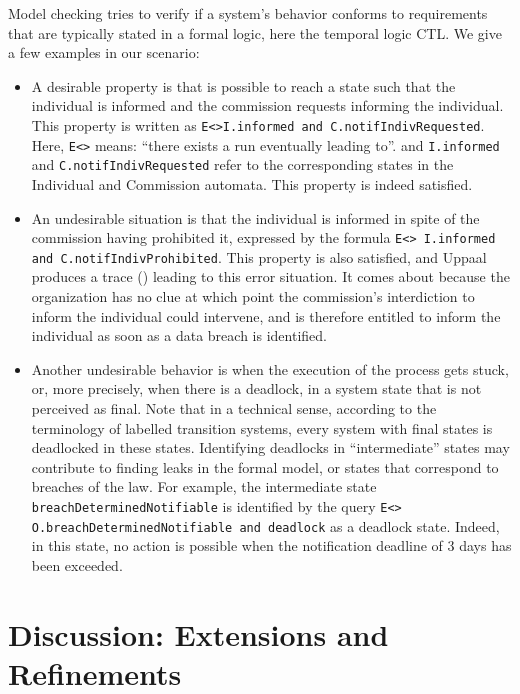 Model checking tries to verify if a system's behavior conforms to requirements
that are typically stated in a formal logic, here the temporal logic CTL. We
give a few  examples in our scenario:

\begin{itemize}
\item A desirable property is that is possible to reach a state such that the
  individual is informed and the commission requests informing the
  individual. This property is written as \texttt{E<>I.informed and
    C.notifIndivRequested}. Here, \texttt{E<>} means: ``there exists a run
  eventually leading to''. and \texttt{I.informed} and
  \texttt{C.notifIndivRequested} refer to the corresponding states in the
  Individual and Commission automata. This property is indeed satisfied.

  
\item An undesirable situation is that the individual is informed in spite of
  the commission having prohibited it, expressed by the formula \texttt{E<>
    I.informed and C.notifIndivProhibited}. This property is also satisfied,
  and Uppaal produces a trace () leading to this error
  situation. It comes about because the organization has no clue at which
  point the commission's interdiction to inform the individual could
  intervene, and is therefore entitled to inform the individual as soon as a
  data breach is identified.

\item Another undesirable behavior is when the execution of the process gets
  stuck, or, more precisely, when there is a deadlock, in a system state that
  is not perceived as final. Note that in a technical sense, according to the
  terminology of labelled transition systems, every system with final states
  is deadlocked in these states. Identifying deadlocks in ``intermediate''
  states may contribute to finding leaks in the formal model, or states that
  correspond to breaches of the law. For example, the intermediate state
  \texttt{breachDeterminedNotifiable} is identified by the query \texttt{E<>
    O.breachDeterminedNotifiable and deadlock} as a deadlock state. Indeed, in
  this state, no action is possible when the notification deadline of 3 days
  has been exceeded.
\end{itemize}


\section{Discussion: Extensions and Refinements}\label{sec:discussion}


